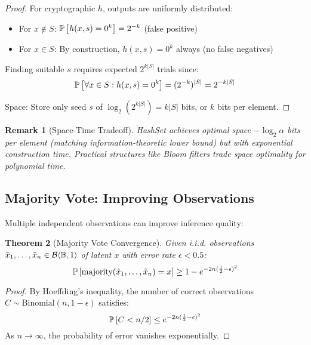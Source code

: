 \documentclass[11pt,final,hidelinks]{article}
\newtheorem{theorem}{Theorem}[section]
\newtheorem{remark}[theorem]{Remark}
\newcommand{\bernoulli}[2]{\mathcal{B}\langle #1, #2 \rangle}
\begin{document}
\begin{proof}
For cryptographic $h$, outputs are uniformly distributed:
\begin{itemize}
    \item For $x \notin S$: $\mathbb{P}\left[h(x, s) = 0^k\right] = 2^{-k}$ (false positive)
    \item For $x \in S$: By construction, $h(x, s) = 0^k$ always (no false negatives)
\end{itemize}

Finding suitable $s$ requires expected $2^{k|S|}$ trials since:
\begin{equation}
\mathbb{P}\left[\forall x \in S: h(x, s) = 0^k\right] = (2^{-k})^{|S|} = 2^{-k|S|}
\end{equation}

Space: Store only seed $s$ of $\log_2(2^{k|S|}) = k|S|$ bits, or $k$ bits per element.
\end{proof}

\begin{remark}[Space-Time Tradeoff]
HashSet achieves optimal space $-\log_2 \alpha$ bits per element (matching information-theoretic lower bound) but with exponential construction time. Practical structures like Bloom filters trade space optimality for polynomial time.
\end{remark}

\subsection{Majority Vote: Improving Observations}

Multiple independent observations can improve inference quality:

\begin{theorem}[Majority Vote Convergence]
Given i.i.d. observations $\tilde{x}_1, \ldots, \tilde{x}_n \in \bernoulli{\Bool}{1}$ of latent $x$ with error rate $\epsilon < 0.5$:
\begin{equation}
\mathbb{P}\left[\text{majority}(\tilde{x}_1, \ldots, \tilde{x}_n) = x\right] \geq 1 - e^{-2n(\frac{1}{2} - \epsilon)^2}
\end{equation}
\end{theorem}

\begin{proof}
By Hoeffding's inequality, the number of correct observations $C \sim \text{Binomial}(n, 1-\epsilon)$ satisfies:
\begin{equation}
\mathbb{P}\left[C < n/2\right] \leq e^{-2n(\frac{1}{2} - \epsilon)^2}
\end{equation}
As $n \to \infty$, the probability of error vanishes exponentially.
\end{proof}
\end{document}
